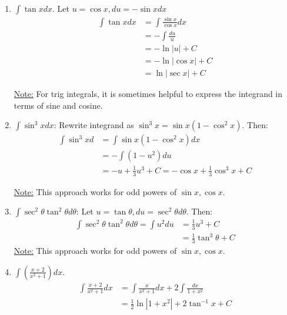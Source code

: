\documentclass[11pt]{article}
\theoremstyle{plain}
\theoremstyle{remark}
\theoremstyle{plain}
\begin{document}
\begin{tcolorbox}[colback=magenta!5!white,colframe=magenta!75!black,title=Problem 3 ]
    \begin{enumerate}
        \item $\int\tan xdx$. Let $u=\cos x, du=-\sin xdx$
        \begin{align*}
            \int\tan x dx&=\int\frac{\sin x}{\cos x}dx\\
            &=-\int\frac{du}{u} \\&=-\ln|u| + C\\
            &=-\ln|\cos x|+C\\
            &=\ln|\sec x|+C
        \end{align*}

        \underline{Note:} For trig integrals, it is sometimes helpful to express the integrand in terms of sine and cosine.

        \item $\int\sin^3xdx$: 
        Rewrite integrand as $\sin^3x=\sin x(1-\cos^2x)$. Then:
        \begin{align*}
            \int\sin^3xd&=\int\sin x(1-\cos^2x)dx\\
            &=-\int(1-u^2)du\\
            &=-u+\frac{1}{3}u^3+C=-\cos x+\frac{1}{3}\cos^3x+C
        \end{align*}

        \underline{Note:} This approach works for odd powers of $\sin x, \cos x$.

        \item $\int\sec^2\theta \tan^2\theta d\theta$:
        Let $u=\tan\theta, du=\sec^2\theta d\theta$. Then:
        \begin{align*}
            \int\sec^2\theta\tan^2\theta d\theta =\int u^2du&=\frac{1}{3}u^3+C\\
            &=\frac{1}{3}\tan^3\theta +C
        \end{align*}
        \underline{Note:} This approach works for odd powers of $\sin x, \cos x$.

        \item $\int(\frac{x+2}{x^2+1})dx$.
         \begin{align*}
            \int\frac{x+2}{x^2+1}dx&=\int\frac{x}{x^2+1}dx+2\int\frac{dx}{1+x^2}\\
            &=\frac{1}{2}\ln|1+x^2| + 2\tan^{-1}x+C
        \end{align*}
    \end{enumerate}
\end{tcolorbox}   
\end{document}
